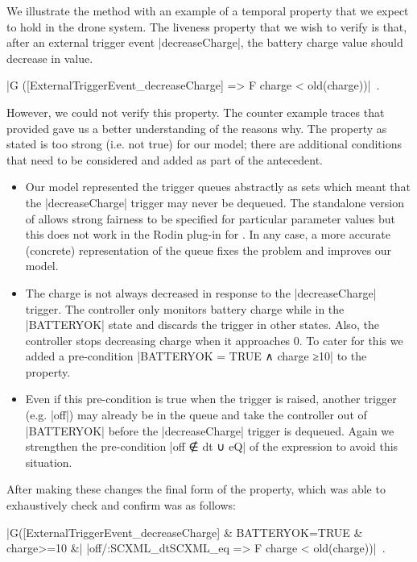 We illustrate the method with an example of a temporal property that we expect to hold in the drone \SCXML system. 
The liveness property that we wish to  verify is that, after an external trigger event |decreaseCharge|, the battery charge value should  decrease in value.
\begin{center}
  |G ([ExternalTriggerEvent_decreaseCharge] => F {charge < old(charge)})|~.
\end{center}
However, we could not verify this property.
The counter example traces that \PROB provided gave us a better understanding of the reasons why. 
The property as stated is too strong (i.e. not true) for our model; there are additional conditions that need to be considered and added as part of the antecedent.
\begin{itemize}
\item
Our model represented the trigger queues abstractly as sets which meant that the |decreaseCharge| trigger may never be dequeued.
The standalone version of \PROB allows strong fairness to be specified for particular parameter values but this does not work in the Rodin plug-in for \PROB. 
In any case, a more accurate (concrete) representation of the queue fixes the problem and improves our model.
\item 
The charge is not always decreased in response to the |decreaseCharge| trigger.
The controller only monitors battery charge while in the |BATTERYOK| state and discards the trigger in other states.
Also, the controller stops decreasing charge when it approaches 0. 
To cater for this we added a pre-condition |BATTERYOK = TRUE ∧ charge ≥10| to the \LTL property.
\item
Even if this pre-condition is true when the trigger is raised, another trigger (e.g. |off|) may already be in the queue and take the controller out of |BATTERYOK| before the |decreaseCharge| trigger is dequeued.
Again we strengthen the pre-condition |off ∉ dt ∪ eQ| of the \LTL expression to avoid this situation.
\end{itemize}
After making these changes the final form of the \LTL property, which \PROB was able to exhaustively check and confirm was as follows:
\begin{center}
	|G([ExternalTriggerEvent_decreaseCharge] & {BATTERYOK=TRUE & charge>=10 &|
		|off/:SCXML_dt\/SCXML_eq} => F {charge < old(charge)})|~.
\end{center}


